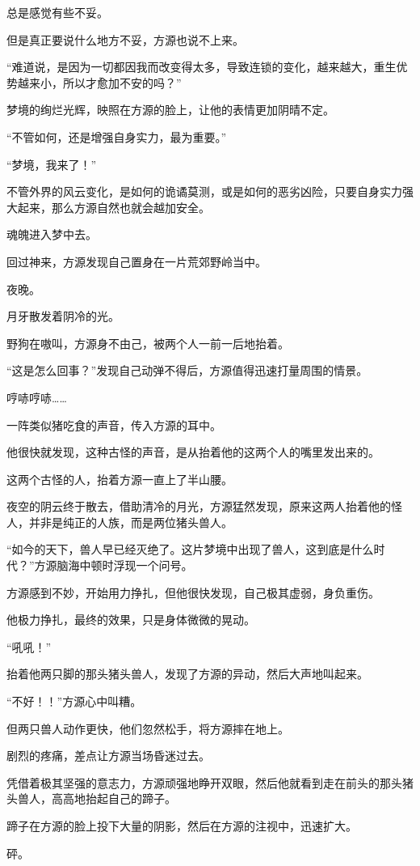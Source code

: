 \begin{this_body}
总是感觉有些不妥。

但是真正要说什么地方不妥，方源也说不上来。

“难道说，是因为一切都因我而改变得太多，导致连锁的变化，越来越大，重生优势越来小，所以才愈加不安的吗？”

梦境的绚烂光辉，映照在方源的脸上，让他的表情更加阴晴不定。

“不管如何，还是增强自身实力，最为重要。”

“梦境，我来了！”

不管外界的风云变化，是如何的诡谲莫测，或是如何的恶劣凶险，只要自身实力强大起来，那么方源自然也就会越加安全。

魂魄进入梦中去。

回过神来，方源发现自己置身在一片荒郊野岭当中。

夜晚。

月牙散发着阴冷的光。

野狗在嗷叫，方源身不由己，被两个人一前一后地抬着。

“这是怎么回事？”发现自己动弹不得后，方源值得迅速打量周围的情景。

哼哧哼哧……

一阵类似猪吃食的声音，传入方源的耳中。

他很快就发现，这种古怪的声音，是从抬着他的这两个人的嘴里发出来的。

这两个古怪的人，抬着方源一直上了半山腰。

夜空的阴云终于散去，借助清冷的月光，方源猛然发现，原来这两人抬着他的怪人，并非是纯正的人族，而是两位猪头兽人。

“如今的天下，兽人早已经灭绝了。这片梦境中出现了兽人，这到底是什么时代？”方源脑海中顿时浮现一个问号。

方源感到不妙，开始用力挣扎，但他很快发现，自己极其虚弱，身负重伤。

他极力挣扎，最终的效果，只是身体微微的晃动。

“吼吼！”

抬着他两只脚的那头猪头兽人，发现了方源的异动，然后大声地叫起来。

“不好！！”方源心中叫糟。

但两只兽人动作更快，他们忽然松手，将方源摔在地上。

剧烈的疼痛，差点让方源当场昏迷过去。

凭借着极其坚强的意志力，方源顽强地睁开双眼，然后他就看到走在前头的那头猪头兽人，高高地抬起自己的蹄子。

蹄子在方源的脸上投下大量的阴影，然后在方源的注视中，迅速扩大。

砰。


\end{this_body}
